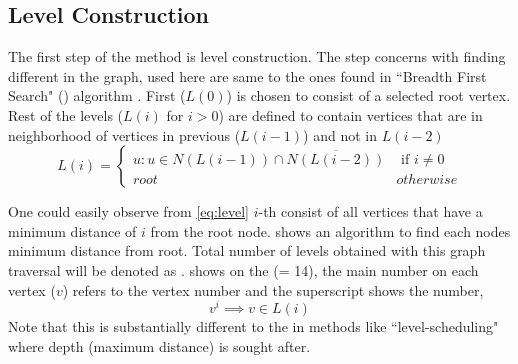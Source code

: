 \subsection{Level Construction}\label{subsec:LEVEL_CONST}
The first step of the \RACE method is level construction. The step concerns with finding different \levels in the graph, \levels used here are same to the ones found in ``Breadth First Search" (\BFS) algorithm \cite{BFS}. First \level ($L(0)$) is chosen to consist of a selected root vertex. Rest of the levels ($L(i)$ for $i > 0$) are defined to  contain vertices that are in neighborhood of vertices in previous \level ($L(i-1)$) and not in $L(i-2)$ \cite{BFS_level_def} \ie
\begin{equation}\label{eq:level}
L(i) = 
\begin{cases}
	  u : u \in N(L(i-1)) \cap \overline{N(L(i-2))}  & \text{ if } i \neq 0 \\
	 root & otherwise
\end{cases}   
\end{equation}

 One could easily observe from \cref{eq:level} $i$-th \level consist of all vertices that have a minimum distance of $i$ from the root node.  shows an algorithm to find each nodes minimum distance from root. Total number of levels obtained with this graph traversal will be denoted as \totalLvl.  shows \levels on the \STEX (\totalLvl = 14), the main number on each vertex ($v$) refers to the vertex number and the superscript shows the \level number, \ie
\begin{equation}\label{eq:node_notation}
	v^i \implies v \in L(i)
\end{equation}
Note that this is substantially different to the \levels in methods like ``level-scheduling" \cite{saad} where depth (maximum distance) is sought after.

